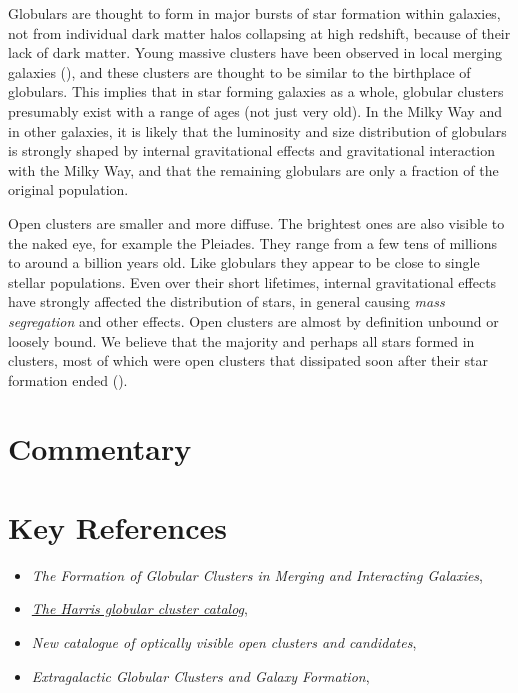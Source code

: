 Globulars are thought to form in major bursts of star formation within
galaxies, not from individual dark matter halos collapsing at high
redshift, because of their lack of dark matter. Young massive clusters
have been observed in local merging galaxies (\citealt{ashman92a}),
and these clusters are thought to be similar to the birthplace of
globulars. This implies that in star forming galaxies as a whole,
globular clusters presumably exist with a range of ages (not just very
old).  In the Milky Way and in other galaxies, it is likely that the
luminosity and size distribution of globulars is strongly shaped by
internal gravitational effects and gravitational interaction with the
Milky Way, and that the remaining globulars are only a fraction of the
original population.

Open clusters are smaller and more diffuse. The brightest ones are
also visible to the naked eye, for example the Pleiades. They range
from a few tens of millions to around a billion years old. Like
globulars they appear to be close to single stellar populations. Even
over their short lifetimes, internal gravitational effects have
strongly affected the distribution of stars, in general causing {\it
mass segregation} and other effects. Open clusters are almost by
definition unbound or loosely bound. We believe that the majority and
perhaps all stars formed in clusters, most of which were open clusters
that dissipated soon after their star formation ended
(\citealt{lada03a}).

\section{Commentary}

\section{Key References}

\begin{itemize}
  \item
    {\it The Formation of Globular Clusters in Merging and Interacting
    Galaxies}, \citet{ashman92a}
  \item
    \href{http://physwww.mcmaster.ca/~harris/mwgc.dat}{\it The Harris globular cluster catalog}, \citet{harris96a}
  \item
    {\it New catalogue of optically visible open clusters and
    candidates}, \citet{dias02a}
  \item
    {\it Extragalactic Globular Clusters and Galaxy
    Formation}, \citet{brodie06a}
\end{itemize}

